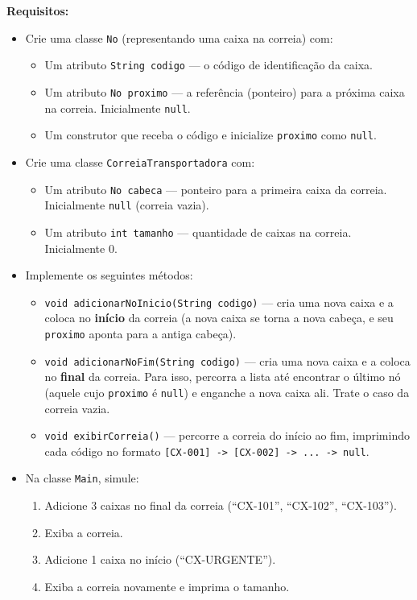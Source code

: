 \documentclass[12pt, a4paper]{article}
\begin{document}
\textbf{Requisitos:}
\begin{itemize}
    \item Crie uma classe \texttt{No} (representando uma caixa na correia) com:
    \begin{itemize}
        \item Um atributo \texttt{String codigo} — o código de identificação da caixa.
        \item Um atributo \texttt{No proximo} — a referência (ponteiro) para a próxima caixa na correia. Inicialmente \texttt{null}.
        \item Um construtor que receba o código e inicialize \texttt{proximo} como \texttt{null}.
    \end{itemize}
    \item Crie uma classe \texttt{CorreiaTransportadora} com:
    \begin{itemize}
        \item Um atributo \texttt{No cabeca} — ponteiro para a primeira caixa da correia. Inicialmente \texttt{null} (correia vazia).
        \item Um atributo \texttt{int tamanho} — quantidade de caixas na correia. Inicialmente 0.
    \end{itemize}
    \item Implemente os seguintes métodos:
    \begin{itemize}
        \item \texttt{void adicionarNoInicio(String codigo)} — cria uma nova caixa e a coloca no \textbf{início} da correia (a nova caixa se torna a nova cabeça, e seu \texttt{proximo} aponta para a antiga cabeça).
        \item \texttt{void adicionarNoFim(String codigo)} — cria uma nova caixa e a coloca no \textbf{final} da correia. Para isso, percorra a lista até encontrar o último nó (aquele cujo \texttt{proximo} é \texttt{null}) e enganche a nova caixa ali. Trate o caso da correia vazia.
        \item \texttt{void exibirCorreia()} — percorre a correia do início ao fim, imprimindo cada código no formato \texttt{[CX-001] -> [CX-002] -> ... -> null}.
    \end{itemize}
    \item Na classe \texttt{Main}, simule:
    \begin{enumerate}
        \item Adicione 3 caixas no final da correia (``CX-101'', ``CX-102'', ``CX-103'').
        \item Exiba a correia.
        \item Adicione 1 caixa no início (``CX-URGENTE'').
        \item Exiba a correia novamente e imprima o tamanho.
    \end{enumerate}
\end{itemize}
\end{document}
